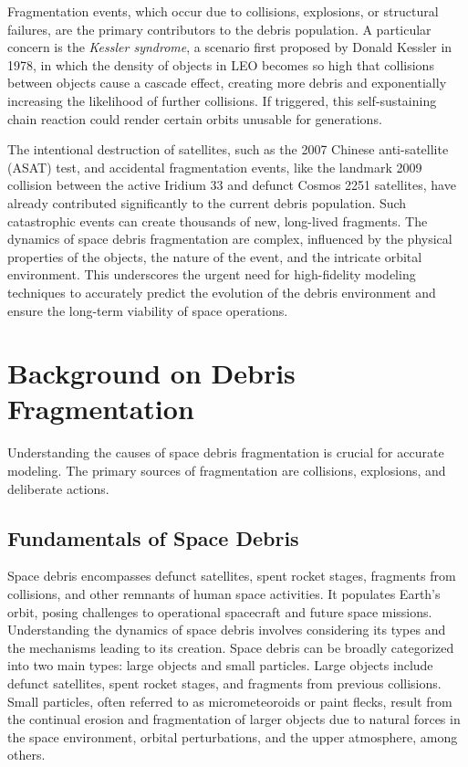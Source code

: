 \documentclass[letterpaper, paper,11pt]{AAS}
\begin{document}
Fragmentation events, which occur due to collisions, explosions, or structural failures, are the primary contributors to the debris population. A particular concern is the \textit{Kessler syndrome}, a scenario first proposed by Donald Kessler in 1978, in which the density of objects in LEO becomes so high that collisions between objects cause a cascade effect, creating more debris and exponentially increasing the likelihood of further collisions\cite{kessler_collision_1978}. If triggered, this self-sustaining chain reaction could render certain orbits unusable for generations.

The intentional destruction of satellites, such as the 2007 Chinese anti-satellite (ASAT) test, and accidental fragmentation events, like the landmark 2009 collision between the active Iridium 33 and defunct Cosmos 2251 satellites, have already contributed significantly to the current debris population. Such catastrophic events can create thousands of new, long-lived fragments\cite{wang_analysis_2010}. The dynamics of space debris fragmentation are complex, influenced by the physical properties of the objects, the nature of the event, and the intricate orbital environment. This underscores the urgent need for high-fidelity modeling techniques to accurately predict the evolution of the debris environment and ensure the long-term viability of space operations.

\section{Background on Debris Fragmentation}

Understanding the causes of space debris fragmentation is crucial for accurate modeling. The primary sources of fragmentation are collisions, explosions, and deliberate actions.

\subsection{Fundamentals of Space Debris}

Space debris encompasses defunct satellites, spent rocket stages, fragments from collisions, and other remnants of human space activities. It populates Earth's orbit, posing challenges to operational spacecraft and future space missions. Understanding the dynamics of space debris involves considering its types and the mechanisms leading to its creation. Space debris can be broadly categorized into two main types: large objects and small particles. Large objects include defunct satellites, spent rocket stages, and fragments from previous collisions. Small particles, often referred to as micrometeoroids or paint flecks, result from the continual erosion and fragmentation of larger objects due to natural forces in the space environment, orbital perturbations, and the upper atmosphere, among others.
\end{document}
